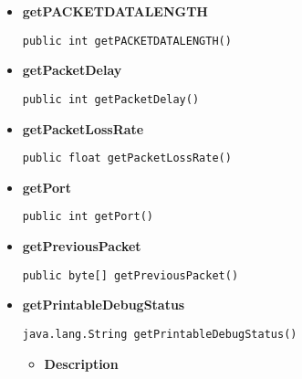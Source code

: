 {{{{{\begin{itemize}
{\begin{itemize}
{Generates a new file name for saving a downloaded file.
}
\item{
{\bf  Parameters}
  \begin{itemize}
   \item{
\texttt{fileName} -- the original file name.}
  \end{itemize}
}%
\item{{\bf  Returns} -- 
the file name. 
}%
\end{itemize}
}%
\item{ 
\hypertarget{filetransferUDP.FileTransfer.getPACKETDATALENGTH()}{{\bf  getPACKETDATALENGTH}\\}
\begin{lstlisting}[frame=none]
public int getPACKETDATALENGTH()\end{lstlisting} %
}%
\item{ 
\hypertarget{filetransferUDP.FileTransfer.getPacketDelay()}{{\bf  getPacketDelay}\\}
\begin{lstlisting}[frame=none]
public int getPacketDelay()\end{lstlisting} %
}%
\item{ 
\hypertarget{filetransferUDP.FileTransfer.getPacketLossRate()}{{\bf  getPacketLossRate}\\}
\begin{lstlisting}[frame=none]
public float getPacketLossRate()\end{lstlisting} %
}%
\item{ 
\hypertarget{filetransferUDP.FileTransfer.getPort()}{{\bf  getPort}\\}
\begin{lstlisting}[frame=none]
public int getPort()\end{lstlisting} %
}%
\item{ 
\hypertarget{filetransferUDP.FileTransfer.getPreviousPacket()}{{\bf  getPreviousPacket}\\}
\begin{lstlisting}[frame=none]
public byte[] getPreviousPacket()\end{lstlisting} %
}%
\item{ 
\hypertarget{filetransferUDP.FileTransfer.getPrintableDebugStatus()}{{\bf  getPrintableDebugStatus}\\}
\begin{lstlisting}[frame=none]
 java.lang.String getPrintableDebugStatus()\end{lstlisting} %
\begin{itemize}
\item{
{\bf  Description}

}
\end{itemize}}
\end{itemize}}}}}}
